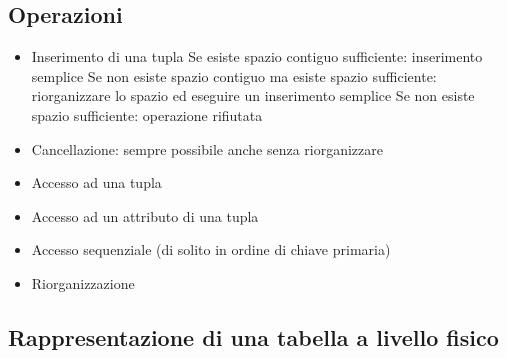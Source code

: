 \documentclass[a4paper, 10pt]{article}
\theoremstyle{definition}
\begin{document}
	\subsection*{Operazioni}
	\begin{itemize}
		\item Inserimento di una tupla
			\subitem Se esiste spazio contiguo sufficiente: inserimento semplice
			\subitem Se non esiste spazio contiguo ma esiste spazio sufficiente:
			riorganizzare lo spazio ed eseguire un inserimento semplice
			\subitem Se non esiste spazio sufficiente: operazione rifiutata
		\item Cancellazione: sempre possibile anche senza riorganizzare
		\item Accesso ad una tupla
		\item Accesso ad un attributo di una tupla
		\item Accesso sequenziale (di solito in ordine di chiave primaria)
		\item Riorganizzazione
	\end{itemize}
	
	\subsection*{Rappresentazione di una tabella a livello fisico}
\end{document}
